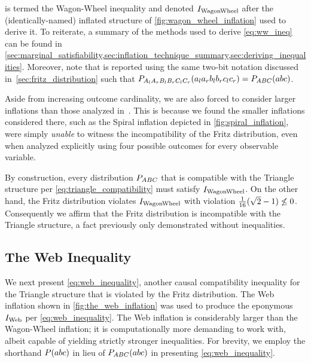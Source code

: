 \documentclass[aps, 10pt, english, twoside, pra, nofootinbib, tightenlines, longbibliography, superscriptaddress]{revtex4-1}
\begin{document}
     is termed the Wagon-Wheel inequality and denoted $I_\text{WagonWheel}$ after the (identically-named) inflated structure of \cref{fig:wagon_wheel_inflation} used to derive it. To reiterate, a summary of the methods used to derive \cref{eq:ww_ineq} can be found in \cref{sec:marginal_satisfiability,sec:inflation_technique_summary,sec:deriving_inequalities}. Moreover, note that  is reported using the same two-bit notation discussed in~\cref{sec:fritz_distribution} such that $\prob[A_{l}A_{r}B_{l}B_{r}C_{l}C_{r}][a_{l}a_{r}b_{l}b_{r}c_{l}c_{r}] = \prob[ABC][abc]$.

    Aside from increasing outcome cardinality, we are also forced to consider larger inflations than those analyzed in~\cite{Inflation}. This is because we found the smaller inflations considered there, such as the Spiral inflation depicted in \cref{fig:spiral_inflation}, were simply \textit{unable} to witness the incompatibility of the Fritz distribution, even when analyzed explicitly using four possible outcomes for every observable variable.

    By construction, every distribution $\prob[ABC]$ that is compatible with the Triangle structure per \cref{eq:triangle_compatibility} must satisfy $I_\text{WagonWheel}$. On the other hand, the Fritz distribution violates $I_\text{WagonWheel}$ with violation $\frac{1}{16}(\sqrt{2} - 1) \not \leq 0$. Consequently we affirm that the Fritz distribution is incompatible with the Triangle structure, a fact previously only demonstrated without inequalities.

    \subsection{The Web Inequality}
    \label{sec:noise}
    \label{sec:violations_noise}
    We next present \cref{eq:web_inequality}, another causal compatibility inequality for the Triangle structure that is violated by the Fritz distribution. The Web inflation shown in \cref{fig:the_web_inflation} was used to produce the eponymous $I_\text{Web}$ per \cref{eq:web_inequality}.  The Web inflation is considerably larger than the Wagon-Wheel inflation; it is computationally more demanding to work with, albeit capable of yielding strictly stronger inequalities. For brevity, we employ the shorthand $\prob\br{abc}$ in lieu of $\prob[ABC]\br{abc}$ in presenting \cref{eq:web_inequality}.
\end{document}
